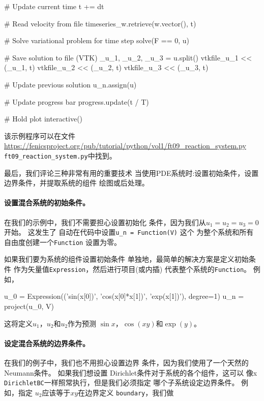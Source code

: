 \begin{python}
    # Update current time
    t += dt

    # Read velocity from file
    timeseries_w.retrieve(w.vector(), t)

    # Solve variational problem for time step
    solve(F == 0, u)

    # Save solution to file (VTK)
    _u_1, _u_2, _u_3 = u.split()
    vtkfile_u_1 << (_u_1, t)
    vtkfile_u_2 << (_u_2, t)
    vtkfile_u_3 << (_u_3, t)

    # Update previous solution
    u_n.assign(u)

    # Update progress bar
    progress.update(t / T)

# Hold plot
interactive()
\end{python}
该示例程序可以在文件\url{https://fenicsproject.org/pub/tutorial/python/vol1/ft09_reaction_system.py} {\nolinkurl{ft09_reaction_system.py}}中找到。


最后，我们评论三种非常有用的重要技术
当使用PDE系统时:设置初始条件，设置
边界条件，并提取系统的组件
绘图或后处理。

\paragraph{设置混合系统的初始条件。}

在我们的示例中，我们不需要担心设置初始化
条件，因为我们从$u_1 = u_2 = u_3 = 0$开始。 这发生了
自动在代码中设置\verb!u_n = Function(V)! 这个
为整个系统和所有自由度创建一个\texttt{Function}
设置为零。

如果我们要为系统的组件设置初始条件
单独地，最简单的解决方案是定义初始条件
作为矢量值\texttt{Expression}，然后进行项目(或内插)
代表整个系统的\texttt{Function}。 例如，

\begin{python}
u_0 = Expression(('sin(x[0])', 'cos(x[0]*x[1])', 'exp(x[1])'), degree=1)
u_n = project(u_0, V)
\end{python}
这将定义$u_1$，$u_2$和$u_2$作为预测
$\sin x$，$\cos (xy)$和$\exp(y)$。

\paragraph{设定混合系统的边界条件。}
在我们的例子中，我们也不用担心设置边界
条件，因为我们使用了一个天然的Neumann条件。 如果我们想设置
Dirichlet条件对于系统的各个组件，这可以
像x \texttt{DirichletBC}一样照常执行，但是我们必须指定
哪个子系统设定边界条件。 例如，指定
$u_2$应该等于$xy$在边界定义
\texttt{boundary}，我们做

